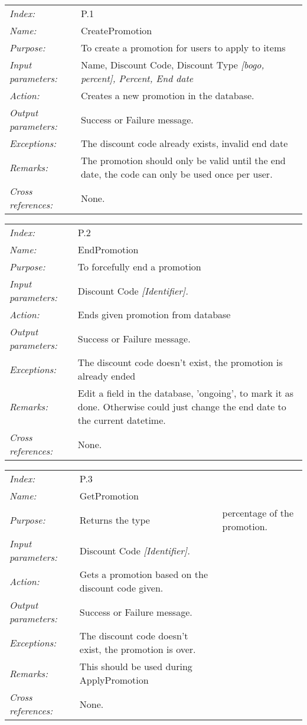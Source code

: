 \documentclass[10pt,letter]{article}
\begin{document}
\begin{tabularx}{\textwidth}{l X}
    \it{Index:} & P.1 \\
    \it{Name:} & CreatePromotion \\
    \it{Purpose:} & To create a promotion for users to apply to items \\
    \it{Input parameters:} & Name, Discount Code, Discount Type \it{[bogo, percent]}, Percent, End date\\
    \it{Action:} & Creates a new promotion in the database.\\
    \it{Output parameters:} & Success or Failure message. \\
    \it{Exceptions:} & The discount code already exists, invalid end date \\
    \it{Remarks:} & The promotion should only be valid until the end date, the code can only be used once per user. \\
    \it{Cross references:} & None. \\
    \hline
\end{tabularx}

\begin{tabularx}{\textwidth}{l X}
    \it{Index:} & P.2 \\
    \it{Name:} & EndPromotion \\
    \it{Purpose:} & To forcefully end a promotion \\
    \it{Input parameters:} & Discount Code \it{[Identifier]}.\\
    \it{Action:} & Ends given promotion from database\\
    \it{Output parameters:} & Success or Failure message. \\
    \it{Exceptions:} & The discount code doesn't exist, the promotion is already ended \\
    \it{Remarks:} & Edit a field in the database, 'ongoing', to mark it as done. Otherwise could just change the end date to the current datetime.\\
    \it{Cross references:} & None. \\
    \hline
\end{tabularx}

\begin{tabularx}{\textwidth}{l X}
    \it{Index:} & P.3 \\
    \it{Name:} & GetPromotion \\
    \it{Purpose:} & Returns the type & percentage of the promotion. \\
    \it{Input parameters:} & Discount Code \it{[Identifier]}.\\
    \it{Action:} & Gets a promotion based on the discount code given.\\
    \it{Output parameters:} & Success or Failure message. \\
    \it{Exceptions:} & The discount code doesn't exist, the promotion is over. \\
    \it{Remarks:} & This should be used during ApplyPromotion\\
    \it{Cross references:} & None. \\
    \hline
\end{tabularx}
\end{document}
